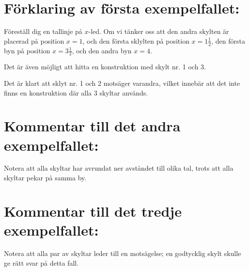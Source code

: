 \section*{Förklaring av första exempelfallet:}
Föreställ dig en tallinje på $x$-led.
Om vi tänker oss att den andra skylten är placerad på position $x = 1$, och den första sklylten på position $x = 1\frac{1}{2}$, 
den första byn på position $x = 3\frac{1}{2}$, och den andra byn $x = 4$. 

Det är även möjligt att hitta en konstruktion med skylt nr. 1 och 3.

Det är klart att sklyt nr. 1 och 2 motsäger varandra, vilket innebär att det inte finns en konstruktion där alla 3 skyltar används.

\section*{Kommentar till det andra exempelfallet:}
Notera att alla skyltar har avrundat ner avståndet till olika tal, trots att alla skyltar pekar på samma by.

\section*{Kommentar till det tredje exempelfallet:}
Notera att alla par av skyltar leder till en motsägelse; en godtycklig skylt skulle ge rätt svar på detta fall.
